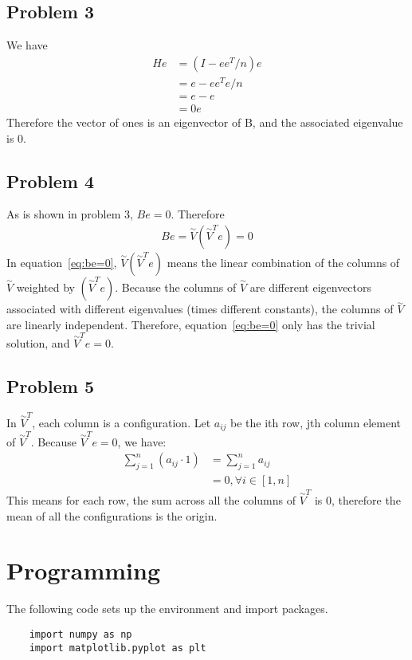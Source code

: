 \documentclass{article}
\begin{document}
\subsection*{Problem 3}
\label{subsec:1.3}
We have
\begin{align*}
He &= (I-ee^T/n)e \\
&= e - ee^Te/n \\
&= e - e \\
&= 0e
\end{align*}
Therefore the vector of ones is an eigenvector of B, and the associated eigenvalue is 0.

\subsection*{Problem 4}
As is shown in problem 3, $Be=0$. Therefore
\begin{align}
\label{eq:be=0}
Be = \overset{\sim}{V}(\overset{\sim}{V}^Te) = 0
\end{align}
In equation~\ref{eq:be=0}, $\overset{\sim}{V}(\overset{\sim}{V}^Te)$ means the linear combination of the columns of $\overset{\sim}{V}$ weighted by $(\overset{\sim}{V}^Te)$. Because the columns of $\overset{\sim}{V}$ are different eigenvectors associated with different eigenvalues (times different constants), the columns of $\overset{\sim}{V}$ are linearly independent. Therefore, equation~\ref{eq:be=0} only has the trivial solution, and $\overset{\sim}{V}^Te=0$. 

\subsection*{Problem 5}
In $\overset{\sim}{V}^T$, each column is a configuration. Let $a_{ij}$ be the ith row, jth column element of $\overset{\sim}{V}^T$. Because $\overset{\sim}{V}^Te=0$, we have:
\begin{align*}
\sum_{j=1}^{n}(a_{ij}\cdot 1) &= \sum_{j=1}^{n}a_{ij} \\
&=  0, \forall i \in [1,n]
\end{align*}
This means for each row, the sum across all the columns of $\overset{\sim}{V}^T$ is 0, therefore the mean of all the configurations is the origin. 

\newpage
\section{Programming}
The following code sets up the environment and import packages.
\begin{lstlisting}
	import numpy as np
	import matplotlib.pyplot as plt
\end{lstlisting}
\end{document}
